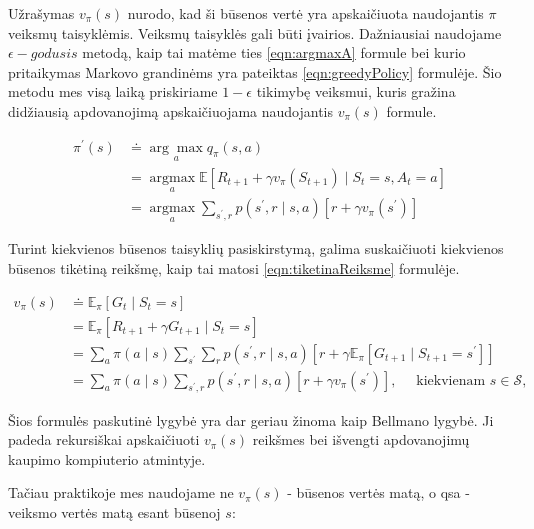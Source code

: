 \documentclass[a4paper, 12pt]{article}
\begin{document}
Užrašymas $v_{\pi}(s)$ nurodo, kad ši būsenos vertė yra apskaičiuota naudojantis ${\pi}$ veiksmų taisyklėmis. Veiksmų taisyklės gali būti įvairios. Dažniausiai naudojame $\epsilon-godusis$ metodą, kaip tai matėme ties \ref{eqn:argmaxA} formule bei kurio pritaikymas Markovo grandinėms yra pateiktas \ref{eqn:greedyPolicy} formulėje. Šio metodu mes visą laiką priskiriame $1-\epsilon$ tikimybę veiksmui, kuris gražina didžiausią apdovanojimą apskaičiuojama naudojantis $v_{\pi}(s)$ formule. 

\begin{equation}
\label{eqn:greedyPolicy}
\begin{aligned}
\pi^{\prime}(s) & \doteq \underset{a}{\arg \max } q_{\pi}(s, a) \\
&=\underset{a}{\operatorname{argmax}} \mathbb{E}\left[R_{t+1}+\gamma v_{\pi}\left(S_{t+1}\right) \mid S_{t}=s, A_{t}=a\right] \\
&=\underset{a}{\operatorname{argmax}} \sum_{s^{\prime}, r} p\left(s^{\prime}, r \mid s, a\right)\left[r+\gamma v_{\pi}\left(s^{\prime}\right)\right]
\end{aligned}
\end{equation}


Turint kiekvienos būsenos taisyklių pasiskirstymą, galima suskaičiuoti kiekvienos būsenos tikėtiną reikšmę, kaip tai matosi \ref{eqn:tiketinaReiksme} formulėje.

\begin{equation}
\label{eqn:tiketinaReiksme}
\begin{aligned}
v_{\pi}(s) & \doteq \mathbb{E}_{\pi}\left[G_{t} \mid S_{t}=s\right] \\
&=\mathbb{E}_{\pi}\left[R_{t+1}+\gamma G_{t+1} \mid S_{t}=s\right] \\
&=\sum_{a} \pi(a \mid s) \sum_{s^{\prime}} \sum_{r} p\left(s^{\prime}, r \mid s, a\right)\left[r+\gamma \mathbb{E}_{\pi}\left[G_{t+1} \mid S_{t+1}=s^{\prime}\right]\right] \\
&=\sum_{a} \pi(a \mid s) \sum_{s^{\prime}, r} p\left(s^{\prime}, r \mid s, a\right)\left[r+\gamma v_{\pi}\left(s^{\prime}\right)\right], \quad \text { kiekvienam } s \in \mathcal{S},
\end{aligned}
\end{equation}

Šios formulės paskutinė lygybė yra dar geriau žinoma kaip Bellmano lygybė. Ji padeda rekursiškai apskaičiuoti $v_{\pi}(s)$ reikšmes bei išvengti apdovanojimų kaupimo kompiuterio atmintyje.

Tačiau praktikoje mes naudojame ne $v_{\pi}(s)$ - būsenos vertės matą, o \gls{qsa} - veiksmo vertės matą esant būsenoj $s$:
\end{document}

